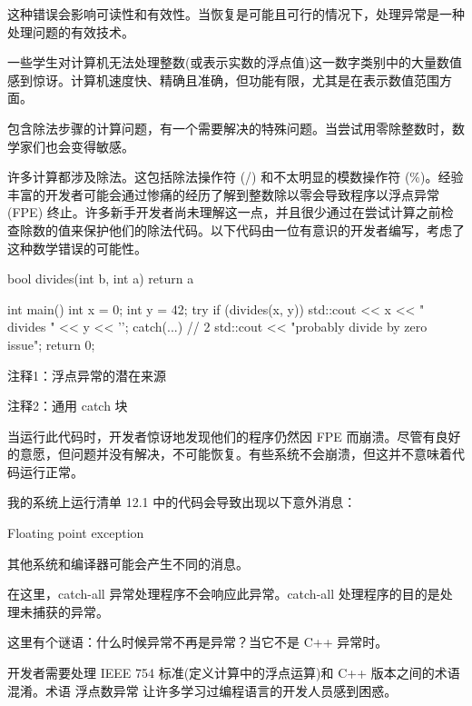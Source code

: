 这种错误会影响可读性和有效性。当恢复是可能且可行的情况下，处理异常是一种处理问题的有效技术。

一些学生对计算机无法处理整数(或表示实数的浮点值)这一数字类别中的大量数值感到惊讶。计算机速度快、精确且准确，但功能有限，尤其是在表示数值范围方面。

包含除法步骤的计算问题，有一个需要解决的特殊问题。当尝试用零除整数时，数学家们也会变得敏感。


许多计算都涉及除法。这包括除法操作符 (/) 和不太明显的模数操作符 (\%)。经验丰富的开发者可能会通过惨痛的经历了解到整数除以零会导致程序以浮点异常 (FPE) 终止。许多新手开发者尚未理解这一点，并且很少通过在尝试计算之前检查除数的值来保护他们的除法代码。以下代码由一位有意识的开发者编写，考虑了这种数学错误的可能性。


\begin{cpp}
bool divides(int b, int a) {
  return a %
}

int main() {
  int x = 0;
  int y = 42;
  try {
  if (divides(x, y))
    std::cout << x << " divides " << y << '\n';
  } catch(...) { // 2
    std::cout << "probably divide by zero issue\n";
  }
  return 0;
}
\end{cpp}

{\footnotesize
注释1：浮点异常的潜在来源

注释2：通用 catch 块
}

当运行此代码时，开发者惊讶地发现他们的程序仍然因 FPE 而崩溃。尽管有良好的意愿，但问题并没有解决，不可能恢复。有些系统不会崩溃，但这并不意味着代码运行正常。


我的系统上运行清单 12.1 中的代码会导致出现以下意外消息：

\begin{shell}
Floating point exception
\end{shell}

其他系统和编译器可能会产生不同的消息。

在这里，catch-all 异常处理程序不会响应此异常。catch-all 处理程序的目的是处理未捕获的异常。


这里有个谜语：什么时候异常不再是异常？当它不是 C++ 异常时。

开发者需要处理 IEEE 754 标准(定义计算中的浮点运算)和 C++ 版本之间的术语混淆。术语 浮点数异常 让许多学习过编程语言的开发人员感到困惑。

